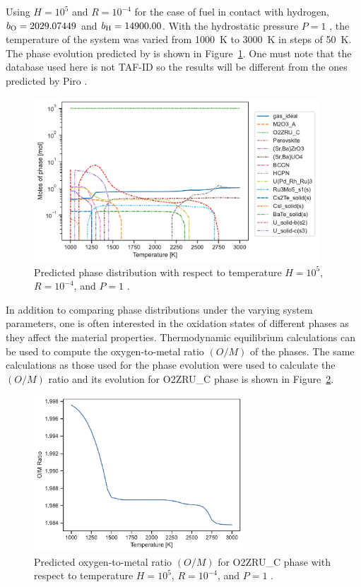 Using $H = 10^5$ and $R = 10^{-4}$ for the case of fuel in contact with hydrogen, $b_{\ce{O}} = 2029.07449$ and $b_{\ce{H}} = 14900.00$. With the hydrostatic pressure $P = 1$ \si{\atmosphere}, the temperature of the system was varied from \SI{1000}{\kelvin} to \SI{3000}{\kelvin} in steps of \SI{50}{\kelvin}. The phase evolution predicted by {\GEM} is shown in Figure~\ref{fig:candu_phase}. One must note that the database used here is not TAF-ID so the results will be different from the ones predicted by Piro \cite{Piro:2022aa}.
\begin{figure}[ht]
         \centering
         \includegraphics[width=0.95\textwidth]{figures/chapter-7/Candu_moles.pdf}
         \caption{Predicted phase distribution with respect to temperature $H = 10^5$, $R = 10^{−4}$, and $P = 1$ \si{\atmosphere}.}
     \label{fig:candu_phase}
\end{figure}

In addition to comparing phase distributions under the varying system parameters, one is often interested in the oxidation states of different phases as they affect the material properties. Thermodynamic equilibrium calculations can be used to compute the oxygen-to-metal ratio $\left(O/M\right)$ of the phases. The same calculations as those used for the phase evolution were used to calculate the $\left(O/M\right)$ ratio and its evolution for O2ZRU\_C phase is shown in Figure~\ref{fig:candu_om}.
\begin{figure}[htb]
         \centering
         \includegraphics[width=0.7\textwidth]{figures/chapter-7/Candu_OM.pdf}
         \caption{Predicted oxygen-to-metal ratio $\left(O/M\right)$ for O2ZRU\_C phase with respect to temperature $H = 10^5$, $R = 10^{−4}$, and $P = 1$ \si{\atmosphere}.}
     \label{fig:candu_om}
\end{figure}

